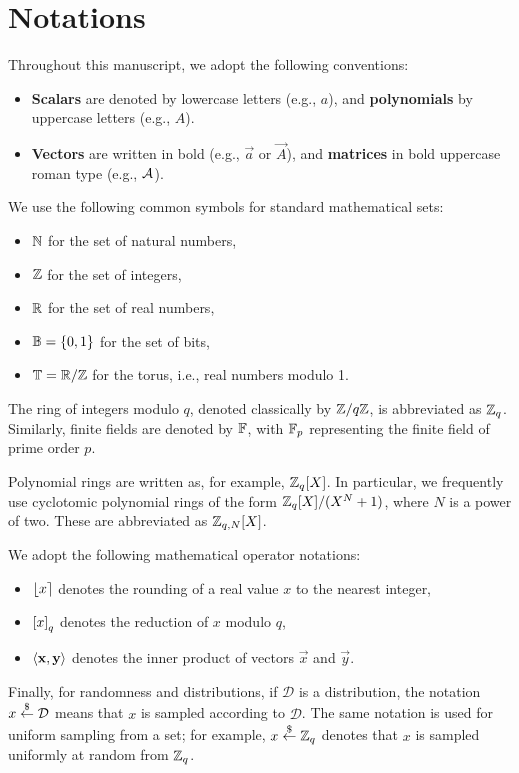 \chapter*{Notations}

Throughout this manuscript, we adopt the following conventions:

\begin{itemize}
	\item \textbf{Scalars} are denoted by lowercase letters (e.g., $a$), and \textbf{polynomials} by uppercase letters (e.g., $A$).
	\item \textbf{Vectors} are written in bold (e.g., $\vec{a}$ or $\vec{A}$), and \textbf{matrices} in bold uppercase roman type (e.g., $\mathcal{A}$).
\end{itemize}

We use the following common symbols for standard mathematical sets:
\begin{itemize}
	\item $\mathbb{N}$ for the set of natural numbers,
	\item $\mathbb{Z}$ for the set of integers,
	\item $\mathbb{R}$ for the set of real numbers,
	\item $\mathbb{B} = \{0, 1\}$ for the set of bits,
	\item $\mathbb{T} = \mathbb{R} / \mathbb{Z}$ for the torus, i.e., real numbers modulo 1.
\end{itemize}

The ring of integers modulo $q$, denoted classically by $\mathbb{Z}/q\mathbb{Z}$, is abbreviated as $\mathbb{Z}_q$. Similarly, finite fields are denoted by $\mathbb{F}$, with $\mathbb{F}_p$ representing the finite field of prime order $p$.

Polynomial rings are written as, for example, $\mathbb{Z}_q[X]$. In particular, we frequently use cyclotomic polynomial rings of the form $\mathbb{Z}_q[X]/(X^N + 1)$, where $N$ is a power of two. These are abbreviated as $\mathbb{Z}_{q, N}[X]$.

We adopt the following mathematical operator notations:
\begin{itemize}
	\item $\left \lfloor x \right \rceil$ denotes the rounding of a real value $x$ to the nearest integer,
	\item $\left [ x \right ]_{q}$ denotes the reduction of $x$ modulo $q$,
	\item $\left \langle \mathbf{x}, \mathbf{y} \right \rangle$ denotes the inner product of vectors $\vec{x}$ and $\vec{y}$.
\end{itemize}

Finally, for randomness and distributions, if $\mathcal{D}$ is a distribution, the notation $x \overset{\$}{\leftarrow} \mathcal{D}$ means that $x$ is sampled according to $\mathcal{D}$. The same notation is used for uniform sampling from a set; for example, $x \overset{\$}{\leftarrow} \mathbb{Z}_q$ denotes that $x$ is sampled uniformly at random from $\mathbb{Z}_q$.

